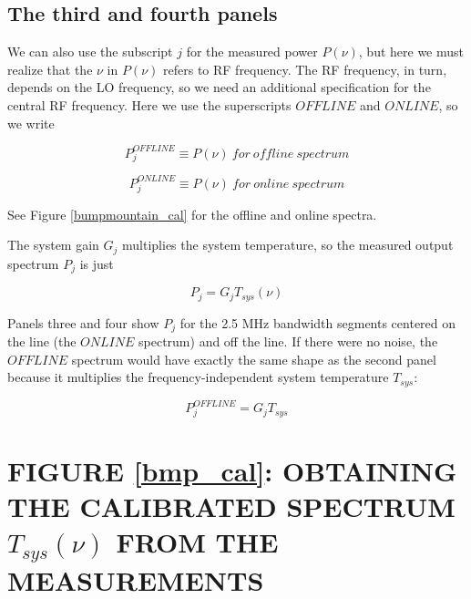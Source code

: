 \documentclass[preprint]{aastex}
\begin{document}

\subsection{The third and fourth panels}

	We can also use the subscript $j$ for the measured power
$P(\nu)$, but here we must realize that the $\nu$ in $P(\nu)$ refers to
RF frequency. The RF frequency, in turn, depends on the LO frequency, so
we need an additional specification for the central RF frequency. Here
we use the superscripts $OFFLINE$ and $ONLINE$, so we write

\begin{equation}
P_j^{OFFLINE} \equiv P(\nu) \ for \ offline \ spectrum
\end{equation}

\begin{equation}
P_j^{ONLINE} \equiv P(\nu) \ for \ online \ spectrum
\end{equation}

\noindent See Figure \ref{bumpmountain_cal} for the offline and online
spectra.

	The system gain $G_j$ multiplies the system temperature, so the
measured output spectrum $P_j$ is just

\begin{equation}
P_j = G_j T_{sys}(\nu)
\end{equation}

	Panels three and four show $P_j$ for the 2.5 MHz bandwidth segments
centered on the line (the $ONLINE$ spectrum) and off the line. If there
were no noise, the $OFFLINE$ spectrum would have exactly the same shape
as the second panel because it multiplies the frequency-independent system
temperature $T_{sys}$:

\begin{equation} \label{basiceqn} 
P_j^{OFFLINE} = G_j T_{sys} 
\end{equation}

\section{FIGURE \ref{bmp_cal}: OBTAINING THE CALIBRATED SPECTRUM
$T_{sys}(\nu)$ FROM THE MEASUREMENTS}
\end{document}
